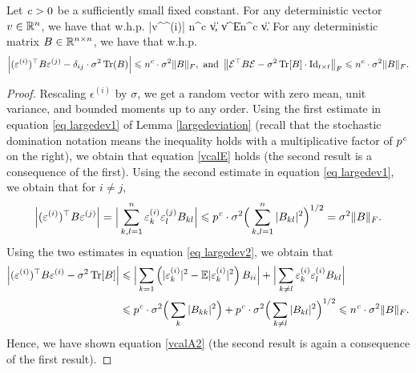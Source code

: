 \begin{corollary}\label{cor_calE}
Let ${\mathit{c}}>0$ be a sufficiently small fixed constant.
For any deterministic vector $v\in \mathbb{R}^n$, we have that w.h.p.
\be\label{vcalE}
	|v^\top \epsilon^{(i)}| \le n^{c} \cdot \sigma \|v\|,  \|v^\top \cal E\| \le n^{c} \cdot \sigma  \|v\|.
\ee
For any deterministic matrix $B \in \mathbb{R}^{n\times n}$, we have that w.h.p.
\begin{align}\label{vcalA2}
	\left|(\varepsilon^{(i)})^\top B \varepsilon^{(j)} - \delta_{ij}\cdot \sigma^2 \operatorname{Tr}(B)\right| \leqslant n^{c}\cdot \sigma^2 \|B\|_F, \text{ and }
	\left\| \mathcal E^\top B \mathcal E - \sigma^2 \operatorname{Tr}[B]\cdot \operatorname{Id}_{t\times t}\right\|_F \leqslant n^{c} \cdot  \sigma^2\|B\|_F.
\end{align}
\end{corollary}
\begin{proof}
Rescaling $\epsilon^{(i)}$ by $\sigma$, we get a random vector with zero mean, unit variance, and bounded moments up to any order.
Using the first estimate in equation \eqref{eq largedev1} of Lemma \ref{largedeviation} (recall that the stochastic domination notation means the inequality holds with a multiplicative factor of $p^{{\mathit{c}}}$ on the right), we obtain that equation \eqref{vcalE} holds (the second result is a consequence of the first).
Using the second estimate in equation \eqref{eq largedev1}, we obtain that for $i\ne j$,
 \begin{align*}
\left|(\varepsilon^{(i)})^\top B \varepsilon^{(j)}\right| = \Big|\sum_{k,l=1}^n \varepsilon^{(i)}_k\varepsilon^{(j)}_l B_{kl} \Big| \leqslant p^{{\mathit{c}}} \cdot \sigma^2 \Big(\sum_{k,l=1}^n|B_{kl}|^2\Big)^{1/2}=\sigma^2 \|B\|_F.
 \end{align*}
Using the two estimates in equation \eqref{eq largedev2}, we obtain that 
\begin{align*}
\left|(\varepsilon^{(i)})^\top B \varepsilon^{(i)} - \sigma^2 \operatorname{Tr}[B]\right| &\leqslant \Big| \sum_{k=1} \left(|\varepsilon^{(i)}_k|^2-\mathbb{E}|\varepsilon^{(i)}_k|^2\right)B_{ii} \Big|+\Big| \sum_{ k\ne l } \varepsilon^{(i)}_k \varepsilon^{(i)}_l B_{kl} \Big| \\
&\leqslant p^{{\mathit{c}}}\cdot \sigma^2 \Big( \sum_{k}|B_{kk}|^2\Big)+ p^{{\mathit{c}}}\cdot \sigma^2 \Big( \sum_{k\ne l}|B_{kl}|^2\Big)^{1/2}\leqslant n^{{\mathit{c}}}\cdot\sigma^2 \|B\|_F.
\end{align*}
Hence, we have shown equation \eqref{vcalA2} (the second result is again a consequence of the first result).
\end{proof}
